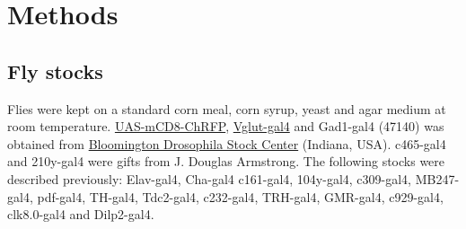 \section*{Methods}

\subsection*{Fly stocks}

Flies were kept on a standard corn meal, corn syrup, yeast and agar medium at room temperature.
\href{http://flystocks.bio.indiana.edu/Reports/27392.html}{UAS-mCD8-ChRFP}, \href{http://flystocks.bio.indiana.edu/Reports/26160.html}{Vglut-gal4} and Gad1-gal4 (47140) was obtained from \href{http://flystocks.bio.indiana.edu}{Bloomington Drosophila Stock Center} (Indiana, USA).
c465-gal4 and 210y-gal4 were gifts from J. Douglas Armstrong.
The following stocks were described previously: Elav-gal4\cite{Lin:1994vn}, Cha-gal4\cite{11291099} c161-gal4\cite{renn:1999aa}, 104y-gal4\cite{sakai:2006aa}, c309-gal4\cite{connolly:1996aa}, MB247-gal4\cite{zars:2000aa}, pdf-gal4\cite{renn:1999ab}, TH-gal4\cite{friggi-grelin:2003aa}, Tdc2-gal4\cite{alekseyenko:2010aa}, c232-gal4\cite{renn:1999aa}, TRH-gal4\cite{alekseyenko:2010aa}, GMR-gal4\cite{freeman:1996aa}, c929-gal4\cite{taghert:2001aa}, clk8.0-gal4\cite{glossop:2003aa} and Dilp2-gal4\cite{Rulifson:2002cg}.
  
  
  
  